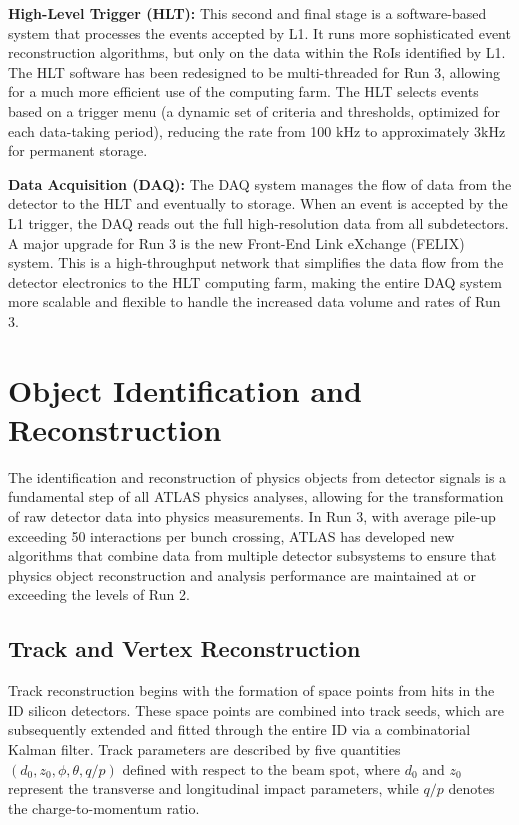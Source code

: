 \textbf{High-Level Trigger (HLT):} This second and final stage is a software-based system that processes the events accepted by L1. It runs more sophisticated event reconstruction algorithms, but only on the data within the RoIs identified by L1. The HLT software has been redesigned to be multi-threaded for Run 3, allowing for a much more efficient use of the computing farm. The HLT selects events based on a trigger menu (a dynamic set of criteria and thresholds, optimized for each data-taking period), reducing the rate from 100 kHz to approximately 3kHz for permanent storage.

\textbf{Data Acquisition (DAQ):} The DAQ system manages the flow of data from the detector to the HLT and eventually to storage. When an event is accepted by the L1 trigger, the DAQ reads out the full high-resolution data from all subdetectors. A major upgrade for Run 3 is the new Front-End Link eXchange (FELIX) system. This is a high-throughput network that simplifies the data flow from the detector electronics to the HLT computing farm, making the entire DAQ system more scalable and flexible to handle the increased data volume and rates of Run 3.



\section{Object Identification and Reconstruction}

The identification and reconstruction of physics objects from detector signals is a fundamental step of all ATLAS physics analyses, allowing for the transformation of raw detector data into physics measurements. In Run 3, with average pile-up exceeding 50 interactions per bunch crossing, ATLAS has developed new algorithms that combine data from multiple detector subsystems to ensure that physics object reconstruction and analysis performance are maintained at or exceeding the levels of Run 2.

\subsection{Track and Vertex Reconstruction}

Track reconstruction begins with the formation of space points from hits in the ID silicon detectors. These space points are combined into track seeds, which are subsequently extended and fitted through the entire ID via a combinatorial Kalman filter. Track parameters are described by five quantities $(d_0, z_0, \phi, \theta, q/p)$ defined with respect to the beam spot, where $d_0$ and $z_0$ represent the transverse and longitudinal impact parameters, while $q/p$ denotes the charge-to-momentum ratio.

